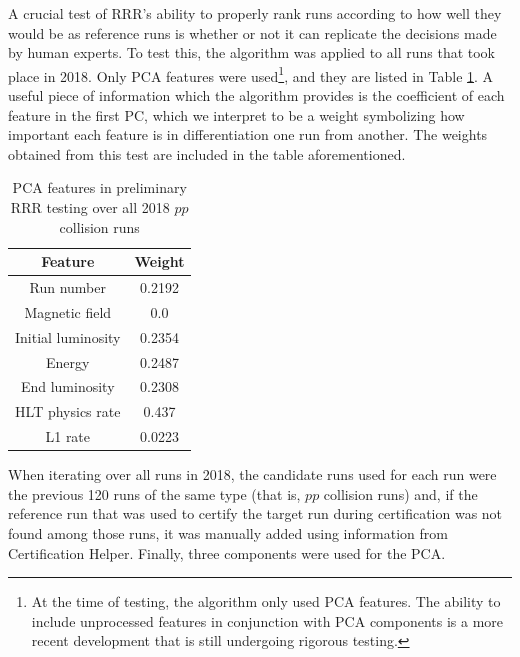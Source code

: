 A crucial test of RRR's ability to properly rank runs according to how well they would be as reference runs is whether or not it can replicate the decisions made by human experts. To test this, the algorithm was applied to all runs that took place in 2018. Only PCA features were used\footnote{At the time of testing, the algorithm only used PCA features. The ability to include unprocessed features in conjunction with PCA components is a more recent development that is still undergoing rigorous testing.}, and they are listed in Table \ref{tab:rrr_ftrs}. A useful piece of information which the algorithm provides is the coefficient of each feature in the first PC, which we interpret to be a weight symbolizing how important each feature is in differentiation one run from another. The weights obtained from this test are included in the table aforementioned.

\begin{table}[h]
  \centering
  \begin{tabular}{|c|c|}
    \hline
    Feature                 & Weight                                    \\ \hline
    Run number              & 0.2192                                    \\ 
    Magnetic field          & 0.0                                       \\ 
    Initial luminosity      & 0.2354                                    \\ 
    Energy                  & 0.2487                                    \\ 
    End luminosity          & 0.2308                                    \\ 
    HLT physics rate        & 0.437                                     \\ 
    L1 rate                 & 0.0223                                     \\ \hline
  \end{tabular}
  \caption{PCA features in preliminary RRR testing over all 2018 $pp$ collision runs}
  \label{tab:rrr_ftrs}
\end{table}

When iterating over all runs in 2018, the candidate runs used for each run were the previous 120 runs of the same type (that is, $pp$ collision runs) and, if the reference run that was used to certify the target run during certification was not found among those runs, it was manually added using information from Certification Helper. Finally, three components were used for the PCA.


